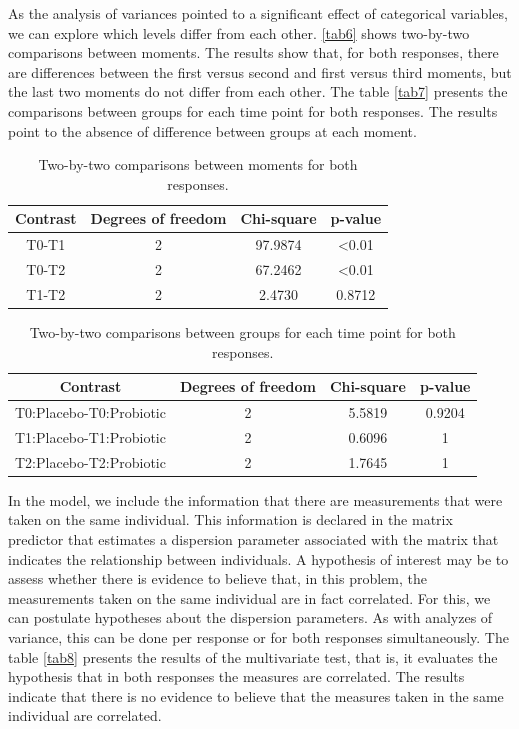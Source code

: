 \documentclass[AMA,STIX1COL]{WileyNJD-v2}
\begin{document}
As the analysis of variances pointed to a significant effect of categorical variables, we can explore which levels differ from each other. \autoref{tab6} shows two-by-two comparisons between moments. The results show that, for both responses, there are differences between the first versus second and first versus third moments, but the last two moments do not differ from each other. The table \autoref{tab7} presents the comparisons between groups for each time point for both responses. The results point to the absence of difference between groups at each moment.

\begin{table}[h]
\centering
\begin{tabular}{cccc}
\hline
Contrast  & Degrees of freedom & Chi-square   & p-value        \\ \hline
T0-T1     & 2                  & 97.9874      & \textless 0.01 \\
T0-T2     & 2                  & 67.2462      & \textless 0.01 \\
T1-T2     & 2                  & 2.4730       & 0.8712         \\ \hline
\end{tabular}
\caption{Two-by-two comparisons between moments for both responses.}
\label{tab6}
\end{table}

\begin{table}[h]
\centering
\begin{tabular}{cccc}
\hline
Contrast                 & Degrees of freedom & Chi-square   & p-value \\ \hline
T0:Placebo-T0:Probiotic  & 2                  & 5.5819       & 0.9204  \\
T1:Placebo-T1:Probiotic  & 2                  & 0.6096       & 1       \\
T2:Placebo-T2:Probiotic  & 2                  & 1.7645       & 1       \\ \hline
\end{tabular}
\caption{Two-by-two comparisons between groups for each time point for both responses.}
\label{tab7}
\end{table}

In the model, we include the information that there are measurements that were taken on the same individual. This information is declared in the matrix predictor that estimates a dispersion parameter associated with the matrix that indicates the relationship between individuals. A hypothesis of interest may be to assess whether there is evidence to believe that, in this problem, the measurements taken on the same individual are in fact correlated. For this, we can postulate hypotheses about the dispersion parameters. As with analyzes of variance, this can be done per response or for both responses simultaneously. The table \autoref{tab8} presents the results of the multivariate test, that is, it evaluates the hypothesis that in both responses the measures are correlated. The results indicate that there is no evidence to believe that the measures taken in the same individual are correlated.
\end{document}

